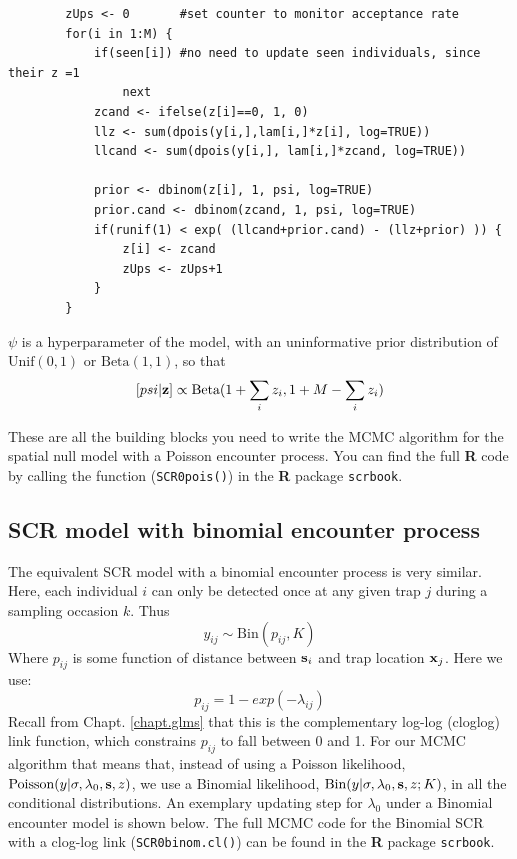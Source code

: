 \begin{verbatim}
        zUps <- 0		#set counter to monitor acceptance rate
        for(i in 1:M) {
            if(seen[i])	#no need to update seen individuals, since their z =1
                next
            zcand <- ifelse(z[i]==0, 1, 0)
            llz <- sum(dpois(y[i,],lam[i,]*z[i], log=TRUE))
            llcand <- sum(dpois(y[i,], lam[i,]*zcand, log=TRUE))

            prior <- dbinom(z[i], 1, psi, log=TRUE)
            prior.cand <- dbinom(zcand, 1, psi, log=TRUE)
            if(runif(1) < exp( (llcand+prior.cand) - (llz+prior) )) {
                z[i] <- zcand
                zUps <- zUps+1
            }
        }
\end{verbatim}

$\psi$
 is a hyperparameter of the model, with an uninformative prior 
 distribution of $\mbox{Unif}(0,1)$ or $\mbox{Beta}(1,1)$, so that
\[
[psi|{\bf z}] \propto \mbox{Beta}(1 + \sum_i z_i, 1 + M-\sum_i z_i)
\]


These are all the building blocks you need to write the MCMC algorithm
for the spatial null model with a Poisson encounter process.  You can
find the full {\bf R} code by calling the function (\mbox{\tt SCR0pois()}) in the {\bf R} package 
\mbox{\tt scrbook}.

\subsection{SCR model with binomial encounter process}
The equivalent SCR model with a binomial encounter process is very similar. Here, each individual $i$ can only be detected once at any given trap $j$ during a sampling occasion $k$.
Thus
\[
y_{ij} \sim \mbox{Bin} (p_{ij}, K)
\]
Where $p_{ij}$ is some function of distance between ${\bf s}_{i}$ and trap location ${\bf x}_{j}$. Here we use:
\[
p_{ij}=1-exp(-\lambda_{ij})
\]
Recall from Chapt. \ref{chapt.glms} that this is the complementary log-log (cloglog) link function, which constrains $p_{ij}$ 
to fall between 0 and 1.
For our MCMC algorithm that means that, instead of using a Poisson 
likelihood, $\mbox{Poisson}(y|\sigma,\lambda_0,{\bf s},z)$, we use a 
Binomial likelihood, $\mbox{Bin}(y| \sigma,\lambda_0,{\bf s},z; K)$, 
in all the conditional distributions. An exemplary updating step for $\lambda_0$ under a Binomial encounter model is shown below. 
The full MCMC code for the Binomial SCR with a clog-log link (\mbox{\tt SCR0binom.cl()}) 
can be found in the {\bf R} package \mbox{\tt scrbook}.

